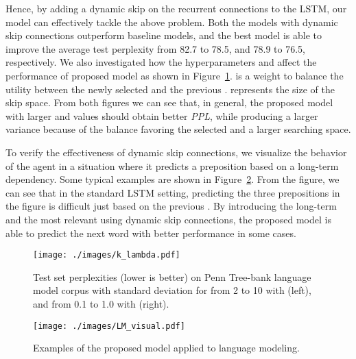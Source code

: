 \documentclass[letterpaper]{article} \usepackage{aaai19}  \usepackage{times}  \usepackage{helvet}  \usepackage{courier}  \usepackage{url}  \usepackage{graphicx}  \usepackage{amsmath}
\begin{document}
Hence, by adding a dynamic skip on the recurrent connections to the LSTM, our model can effectively tackle the above problem. Both the models with dynamic skip connections outperform baseline models, and the best model is able to improve the average test perplexity from 82.7 to 78.5, and 78.9 to 76.5, respectively. We also investigated how the hyperparameters  and  affect the performance of proposed model as shown in Figure~\ref{fig:LMlambda}.  is a weight to balance the utility between the newly selected  and the previous .  represents the size of the skip space. From both figures we can see that, in general, the proposed model with larger  and  values should obtain better \textit{PPL}, while producing a larger variance because of the balance favoring the selected  and a larger searching space.

To verify the effectiveness of dynamic skip connections, we visualize the behavior of the agent in a situation where it predicts a preposition based on a long-term dependency. Some typical examples are shown in Figure~\ref{fig:LM}. From the figure, we can see that in the standard LSTM setting, predicting the three prepositions in the figure is difficult just based on the previous . By introducing the long-term and the most relevant  using dynamic skip connections, the proposed model is able to predict the next word with better performance in some cases.

\begin{figure}[t]
\centering
  \texttt{[image: ./images/k\_lambda.pdf]}
  \caption{Test set perplexities (lower is better) on Penn Tree-bank language model corpus with standard deviation for  from 2 to 10 with  (left), and  from 0.1 to 1.0 with  (right).} \label{fig:LMlambda}
\end{figure}

\begin{figure}
\centering
  \texttt{[image: ./images/LM\_visual.pdf]}
  \caption{Examples of the proposed model applied to language modeling.} \label{fig:LM}
\end{figure}
\end{document}
